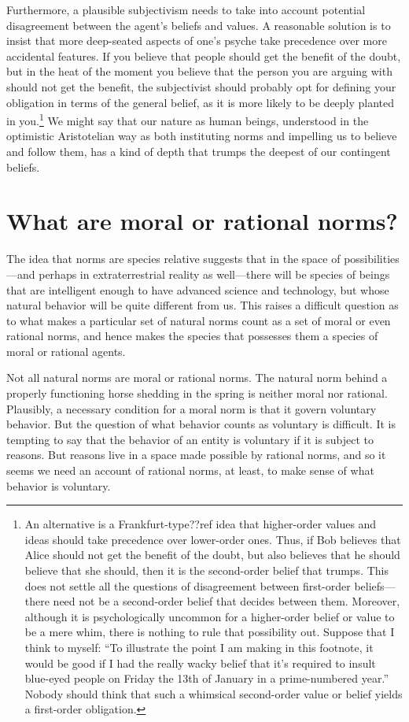 Furthermore, a plausible subjectivism needs to take into account potential disagreement between the agent's 
beliefs and values. A reasonable solution is to insist that more deep-seated aspects of one's psyche take 
precedence over more accidental features. If you believe that people should get the benefit of the doubt, but 
in the heat of the moment you believe that the person you are arguing with should not get the benefit, the 
subjectivist should probably opt for defining your obligation in terms of the general belief, as it is more 
likely to be deeply planted in you.\footnote{An alternative is a Frankfurt-type??ref idea that higher-order values and
ideas should take precedence over lower-order ones. Thus, if Bob believes that Alice should not get the benefit
of the doubt, but also believes that he should believe that she should, then it is the second-order belief that
trumps. This does not settle all the questions of disagreement between first-order beliefs---there need not be a 
second-order belief that decides between them. Moreover, although it is psychologically uncommon for a higher-order
belief or value to be a mere whim, there is nothing to rule that possibility out. Suppose that I think to myself:
``To illustrate the point I am making in this footnote, it would be good if I had the really wacky belief that
it's required to insult blue-eyed people on Friday the 13th of January in a prime-numbered year.'' Nobody
should think that such a whimsical second-order value or belief yields a first-order obligation.} We might say 
that our nature as human beings, understood in the optimistic Aristotelian way as both instituting norms and impelling us 
to believe and follow them, has a kind of depth that trumps the deepest of our contingent beliefs.

\section{What are moral or rational norms?}
The idea that norms are species relative suggests that in the space of possibilities---and perhaps in extraterrestrial reality
as well---there will be species of beings that are intelligent enough to have advanced science and technology, but whose natural
behavior will be quite different from us. This raises a difficult question as to what makes a particular set of
natural norms count as a set of moral or even rational norms, and hence makes the species that possesses them a species of moral 
or rational agents.

Not all natural norms are moral or rational norms. The natural norm behind a properly functioning horse shedding in the spring
is neither moral nor rational. Plausibly, a necessary condition for a moral norm is that it govern voluntary behavior.
But the question of what behavior counts as voluntary is difficult. It is tempting to say that the behavior of an entity is
voluntary if it is subject to reasons. But reasons live in a space made possible by rational norms, and so it seems we need
an account of rational norms, at least, to make sense of what behavior is voluntary.

